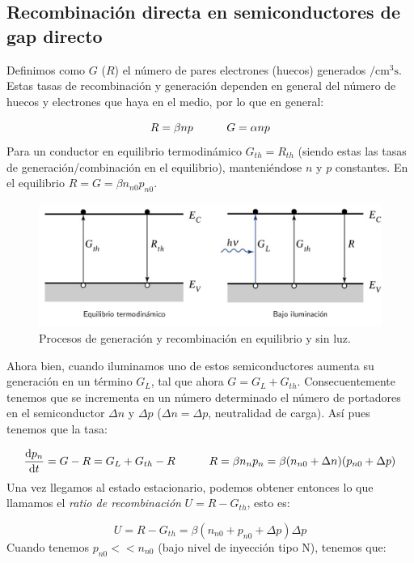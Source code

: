 \subsection{Recombinación directa en semiconductores de gap directo}

Definimos como $G$ ($R$) el número de pares electrones (huecos) generados $/\mathrm{cm}^3\mathrm{s}$. Estas tasas de recombinación y generación dependen en general del número de huecos y electrones que haya en el medio, por lo que en general:

\begin{equation}
	R = \beta np \quad \quad \quad G = \alpha np
\end{equation}
Para un conductor en equilibrio termodinámico $G_{th}=R_{th}$ (siendo estas las tasas de generación/combinación en el equilibrio), manteniéndose $n$ y $p$ constantes. En el equilibrio  $R = G = \beta n_{n0}p_{n0}$.

\begin{figure}[h!] \centering
	\includegraphics[width=0.9\linewidth]{Cuerpo/Ch_02/02_Luz.png}
	\caption{Procesos de generación y recombinación en equilibrio y sin luz.}
\end{figure}
Ahora bien, cuando iluminamos uno de estos semiconductores aumenta su generación en un término $G_L$, tal que ahora $G=G_L+G_{th}$. Consecuentemente tenemos que se incrementa en un número determinado el número de portadores en el semiconductor $\Delta n$ y $\Delta p$ ($\Delta n = \Delta p$, neutralidad de carga). Así pues tenemos que la tasa:


\begin{equation}
	\frac{\mathrm{d} p_n}{\mathrm{d} t} = G-R=G_L + G_{th} - R \quad \quad \quad R = \beta n_n p_n = \beta (n_{n0}+\Delta n) (p_{n0}+\Delta p)
\end{equation}
Una vez llegamos al estado estacionario, podemos obtener entonces lo que llamamos el  \textit{ratio de recombinación} $U=R-G_{th}$, esto es:

\begin{equation}
	U = R-G_{th} = \beta (n_{n0}+p_{n0}+\Delta p)\Delta p
\end{equation}
Cuando tenemos $p_{n0}<<n_{n0}$ (bajo nivel de inyección tipo N), tenemos que:

